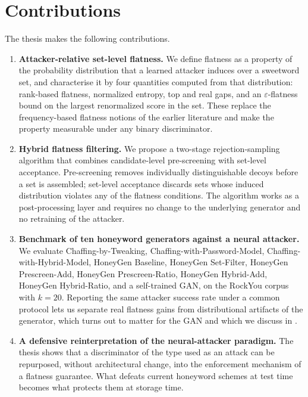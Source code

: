 \section{Contributions}

The thesis makes the following contributions.

\begin{enumerate}

    \item \textbf{Attacker-relative set-level flatness.}
    We define flatness as a property of the probability distribution
    that a learned attacker induces over a sweetword set, and
    characterise it by four quantities computed from that distribution:
    rank-based flatness, normalized entropy, top and real gaps, and an
    $\varepsilon$-flatness bound on the largest renormalized score in
    the set. These replace the frequency-based flatness notions of the
    earlier literature and make the property measurable under any binary
    discriminator.

    \item \textbf{Hybrid flatness filtering.}
    We propose a two-stage rejection-sampling algorithm that combines
    candidate-level pre-screening with set-level acceptance.
    Pre-screening removes individually distinguishable decoys before a
    set is assembled; set-level acceptance discards sets whose induced
    distribution violates any of the flatness conditions. The algorithm
    works as a post-processing layer and requires no change to the
    underlying generator and no retraining of the attacker.

    \item \textbf{Benchmark of ten honeyword generators against a neural
    attacker.} We evaluate Chaffing-by-Tweaking,
    Chaffing-with-Password-Model, Chaffing-with-Hybrid-Model, HoneyGen
    Baseline, HoneyGen Set-Filter, HoneyGen Prescreen-Add, HoneyGen
    Prescreen-Ratio, HoneyGen Hybrid-Add, HoneyGen Hybrid-Ratio, and a
    self-trained GAN, on the RockYou corpus with $k=20$. Reporting the
    same attacker success rate under a common protocol lets us separate
    real flatness gains from distributional artifacts of the generator,
    which turns out to matter for the GAN and which we discuss in
    .

    \item \textbf{A defensive reinterpretation of the neural-attacker
    paradigm.} The thesis shows that a discriminator of the type
    \textcite{dani2024passfilter} used as an attack can be repurposed,
    without architectural change, into the enforcement mechanism of a
    flatness guarantee. What defeats current honeyword schemes at test
    time becomes what protects them at storage time.

\end{enumerate}

